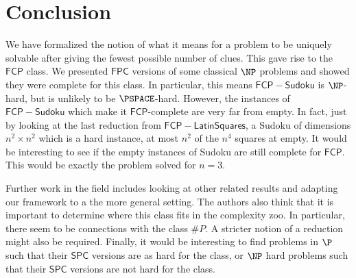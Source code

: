 \documentclass[runningheads,a4paper]{llncs}
\begin{document}
\section{Conclusion}
\label{sec:conclusion}

We have formalized the notion of what it means for a problem to be uniquely solvable after giving the fewest possible number of clues. This gave rise to the $\mathsf{FCP}$ class. We presented $\mathsf{FPC}$ versions of some classical $\NP$ problems and showed they were complete for this class. In particular, this means $\mathsf{FCP-Sudoku}$ is $\NP$-hard, but is unlikely to be $\PSPACE$-hard. However, the instances of $\mathsf{FCP-Sudoku}$ which make it $\mathsf{FCP}$-complete are very far from empty. In fact, just by looking at the last reduction from $\mathsf{FCP-Latin Squares}$, a Sudoku of dimensions $n^2 \times n^2$ which is a hard instance, at most $n^2$ of the $n^4$ squares at empty. It would be interesting to see if the empty instances of Sudoku are still complete for $\mathsf{FCP}$. This would be exactly the problem \cite{mcguire2012there} solved for $n = 3$. 

Further work in the field includes looking at other related results and adapting our framework to a the more general setting. The authors also think that it is important to determine where this class fits in the complexity zoo. In particular, there seem to be connections with the class $\#P$. A stricter notion of a reduction might also be required. Finally, it would be interesting to find problems in $\P$ such that their $\mathsf{SPC}$ versions are as hard for the class, or $\NP$ hard problems such that their $\mathsf{SPC}$ versions are not hard for the class. 



\end{document}
